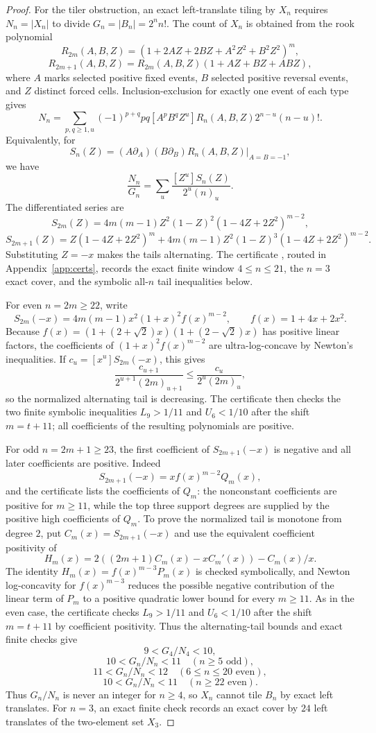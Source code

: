 \begin{proof}
For the tiler obstruction, an exact left-translate tiling by $X_n$ requires $N_n=|X_n|$ to divide
$G_n=|B_n|=2^n n!$.  The count of $X_n$ is obtained from the rook polynomial
\[
  R_{2m}(A,B,Z)=(1+2AZ+2BZ+A^2Z^2+B^2Z^2)^m,
\]
\[
  R_{2m+1}(A,B,Z)=R_{2m}(A,B,Z)(1+AZ+BZ+ABZ),
\]
where $A$ marks selected positive fixed events, $B$ selected positive reversal events, and $Z$ distinct forced cells.
Inclusion-exclusion for exactly one event of each type gives
\[
  N_n=\sum_{p,q\ge1,u}(-1)^{p+q}pq[A^pB^qZ^u]R_n(A,B,Z)2^{n-u}(n-u)!.
\]
Equivalently, for
\[
  S_n(Z)=\left.(A\partial_A)(B\partial_B)R_n(A,B,Z)\right|_{A=B=-1},
\]
we have
\[
  \frac{N_n}{G_n}=\sum_u \frac{[Z^u]S_n(Z)}{2^u(n)_u}.
\]
The differentiated series are
\[
S_{2m}(Z)=4m(m-1)Z^2(1-Z)^2(1-4Z+2Z^2)^{m-2},
\]
\[
S_{2m+1}(Z)=Z(1-4Z+2Z^2)^m+4m(m-1)Z^2(1-Z)^3(1-4Z+2Z^2)^{m-2}.
\]
Substituting $Z=-x$ makes the tails alternating.  The certificate
, routed in Appendix~\ref{app:certs}, records the exact finite window
$4\le n\le21$, the $n=3$ exact cover, and the symbolic all-$n$ tail inequalities below.

For even $n=2m\ge22$, write
\[
  S_{2m}(-x)=4m(m-1)x^2(1+x)^2f(x)^{m-2},\qquad f(x)=1+4x+2x^2.
\]
Because $f(x)=(1+(2+\sqrt2)x)(1+(2-\sqrt2)x)$ has positive linear factors, the coefficients of
$(1+x)^2f(x)^{m-2}$ are ultra-log-concave by Newton's inequalities.  If $c_u=[x^u]S_{2m}(-x)$, this gives
\[
  \frac{c_{u+1}}{2^{u+1}(2m)_{u+1}}\le
  \frac{c_u}{2^u(2m)_u},
\]
so the normalized alternating tail is decreasing.  The certificate then checks the two finite symbolic inequalities
$L_9>1/11$ and $U_6<1/10$ after the shift $m=t+11$; all coefficients of the resulting polynomials are positive.

For odd $n=2m+1\ge23$, the first coefficient of $S_{2m+1}(-x)$ is negative and all later coefficients are positive.
Indeed
\[
S_{2m+1}(-x)=x f(x)^{m-2}Q_m(x),
\]
and the certificate lists the coefficients of $Q_m$: the nonconstant coefficients are positive for $m\ge11$, while the
top three support degrees are supplied by the positive high coefficients of $Q_m$.  To prove the normalized tail is
monotone from degree $2$, put $C_m(x)=S_{2m+1}(-x)$ and use the equivalent coefficient positivity of
\[
  H_m(x)=2((2m+1)C_m(x)-xC_m'(x))-C_m(x)/x.
\]
The identity $H_m(x)=f(x)^{m-3}P_m(x)$ is checked symbolically, and Newton log-concavity for $f(x)^{m-3}$ reduces the
possible negative contribution of the linear term of $P_m$ to a positive quadratic lower bound for every $m\ge11$.
As in the even case, the certificate checks $L_9>1/11$ and $U_6<1/10$ after the shift $m=t+11$ by coefficient
positivity.  Thus the alternating-tail bounds and exact finite checks give
\[
  9< G_4/N_4<10,
\]
\[
  10<G_n/N_n<11\quad(n\ge5\text{ odd}),
\]
\[
  11<G_n/N_n<12\quad(6\le n\le20\text{ even}),
\]
\[
  10<G_n/N_n<11\quad(n\ge22\text{ even}).
\]
Thus $G_n/N_n$ is never an integer for $n\ge4$, so $X_n$ cannot tile $B_n$ by exact left translates.  For $n=3$, an exact finite check records an exact cover by $24$ left translates of the two-element set $X_3$.
\end{proof}
